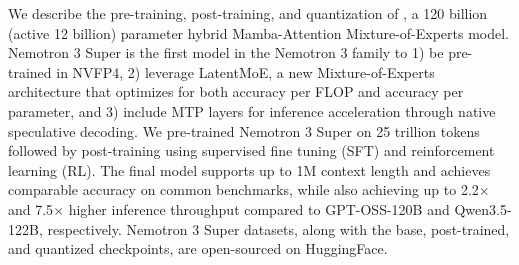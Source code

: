 \normalsize


We describe the pre-training, post-training, and quantization of \ourmodel, a 120 billion (active 12 billion) parameter hybrid Mamba-Attention Mixture-of-Experts model. Nemotron 3 Super is the first model in the Nemotron 3 family to 1) be pre-trained in NVFP4, 2) leverage LatentMoE, a new Mixture-of-Experts architecture that optimizes for both accuracy per FLOP and accuracy per parameter, and 3) include MTP layers for inference acceleration through native speculative decoding. We pre-trained Nemotron 3 Super on 25 trillion tokens followed by post-training using supervised fine tuning (SFT) and reinforcement learning (RL). The final model supports up to 1M context length and achieves comparable accuracy on common benchmarks, while also achieving up to 2.2$\times$ and 7.5$\times$ higher inference throughput compared to GPT-OSS-120B and Qwen3.5-122B, respectively. Nemotron 3 Super datasets, along with the base, post-trained, and quantized checkpoints, are open-sourced on HuggingFace.